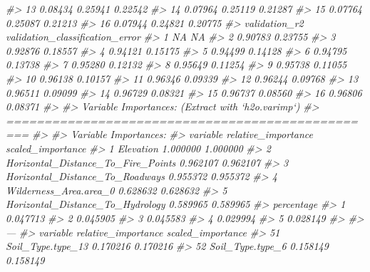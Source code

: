 \documentclass[]{book}
\newenvironment{Shaded}{\begin{snugshade}}{\end{snugshade}}
\newcommand{\CommentTok}[1]{\textcolor[rgb]{0.56,0.35,0.01}{\textit{#1}}}
\begin{document}
\begin{Shaded}
\begin{Highlighting}[]
{{{{{{{{{{{{{{{{{{{{{{{{{{{{{{{{{{{{{{{{{\CommentTok{#> 13                       0.08434         0.25941            0.22542}
\CommentTok{#> 14                       0.07964         0.25119            0.21287}
\CommentTok{#> 15                       0.07764         0.25087            0.21213}
\CommentTok{#> 16                       0.07944         0.24821            0.20775}
\CommentTok{#>    validation_r2 validation_classification_error}
\CommentTok{#> 1             NA                              NA}
\CommentTok{#> 2        0.90783                         0.23755}
\CommentTok{#> 3        0.92876                         0.18557}
\CommentTok{#> 4        0.94121                         0.15175}
\CommentTok{#> 5        0.94499                         0.14128}
\CommentTok{#> 6        0.94795                         0.13738}
\CommentTok{#> 7        0.95280                         0.12132}
\CommentTok{#> 8        0.95649                         0.11254}
\CommentTok{#> 9        0.95738                         0.11055}
\CommentTok{#> 10       0.96138                         0.10157}
\CommentTok{#> 11       0.96346                         0.09339}
\CommentTok{#> 12       0.96244                         0.09768}
\CommentTok{#> 13       0.96511                         0.09099}
\CommentTok{#> 14       0.96729                         0.08321}
\CommentTok{#> 15       0.96737                         0.08560}
\CommentTok{#> 16       0.96806                         0.08371}
\CommentTok{#> }
\CommentTok{#> Variable Importances: (Extract with `h2o.varimp`) }
\CommentTok{#> =================================================}
\CommentTok{#> }
\CommentTok{#> Variable Importances: }
\CommentTok{#>                             variable relative_importance scaled_importance}
\CommentTok{#> 1                          Elevation            1.000000          1.000000}
\CommentTok{#> 2 Horizontal_Distance_To_Fire_Points            0.962107          0.962107}
\CommentTok{#> 3    Horizontal_Distance_To_Roadways            0.955372          0.955372}
\CommentTok{#> 4             Wilderness_Area.area_0            0.628632          0.628632}
\CommentTok{#> 5   Horizontal_Distance_To_Hydrology            0.589965          0.589965}
\CommentTok{#>   percentage}
\CommentTok{#> 1   0.047713}
\CommentTok{#> 2   0.045905}
\CommentTok{#> 3   0.045583}
\CommentTok{#> 4   0.029994}
\CommentTok{#> 5   0.028149}
\CommentTok{#> }
\CommentTok{#> ---}
\CommentTok{#>                       variable relative_importance scaled_importance}
\CommentTok{#> 51           Soil_Type.type_13            0.170216          0.170216}
\CommentTok{#> 52            Soil_Type.type_6            0.158149          0.158149}
}}}}}}}}}}}}}}}}}}}}}}}}}}}}}}}}}}}}}}}}}
\end{Highlighting}
\end{Shaded}
\end{document}
